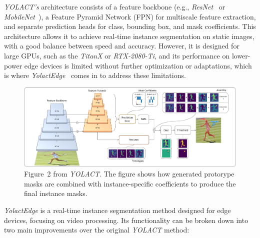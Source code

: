 \textit{YOLACT's} architecture consists of a feature backbone (e.g., \textit{ResNet}~\cite{targ2016resnet} or \textit{MobileNet}~\cite{howard2017mobilenets}), a Feature Pyramid Network (FPN) for multiscale feature extraction, and separate prediction heads for class, bounding box, and mask coefficients.
This architecture allows it to achieve real-time instance segmentation on static images, with a good balance between speed and accuracy.
However, it is designed for large GPUs, such as the \textit{TitanX} or \textit{RTX-2080-Ti}, and its performance on lower-power edge devices is limited without further optimization or adaptations, which is where \textit{YolactEdge}~\cite{liu2021yolactedge} comes in to address these limitations.

\begin{figure}[htb]
    \includegraphics[width=\linewidth]{figures/yolact_fig_2-cropped}
    \caption{Figure~2 from \textit{YOLACT}. The figure shows how generated protorype masks are combined with instance-specific coefficients to produce the final instance masks.}
    \label{fig:yolact}
\end{figure}

\textit{YolactEdge} is a real-time instance segmentation method designed for edge devices, focusing on video processing.
Its functionality can be broken down into two main improvements over the original \textit{YOLACT} method:

